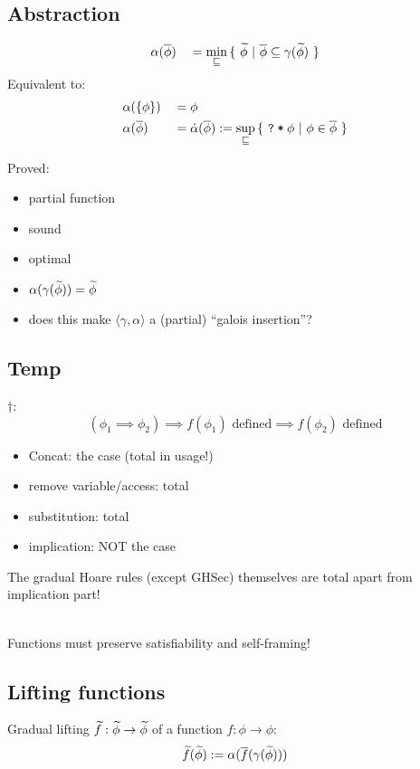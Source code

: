 \documentclass[11pt,a4paper]{article}
\begin{document}
\newcommand{\dalpha}{\dot{\alpha}}

\subsection{Abstraction}
\begin{align*}
&\alpha(\overline{\phi}) &&= \min_{\sqsubseteq} {\{~ \widetilde{\phi} ~|~ \overline{\phi} \subseteq \gamma(\widetilde{\phi}) ~\}}\\
\end{align*}
Equivalent to:
\begin{align*}
&\alpha(\{ \phi \}) &&= \phi\\
&\alpha(\overline{\phi}) &&= \dalpha(\overline{\phi}) := \sup_{\sqsubseteq} {\{~ \withqm{\phi} ~|~ \phi \in \overline{\phi} ~\}}\\
\end{align*}

Proved:
\begin{itemize}
	\item partial function
	\item sound
	\item optimal
	\item $\alpha(\gamma(\widetilde{\phi})) = \widetilde{\phi}$
    \item does this make $\langle \gamma, \alpha \rangle$ a (partial) “galois insertion”?
\end{itemize}

\subsection{Temp}
$\dagger$:
$$(\phi_1 \implies \phi_2) \implies f(\phi_1) \text{ defined} \implies f(\phi_2) \text{ defined}$$
\begin{itemize}
	\item Concat: the case (total in usage!)
	\item remove variable/access: total
	\item substitution: total
	\item implication: NOT the case
\end{itemize}
The gradual Hoare rules (except GHSec) themselves are total apart from implication part!

~\\
Functions must preserve satisfiability and self-framing!


\subsection{Lifting functions}
Gradual lifting $\widetilde{f} : \widetilde{\phi} \rightarrow \widetilde{\phi}$ of a function $f : \phi \rightarrow \phi$:
$$\widetilde{f}(\widetilde{\phi}) := \alpha(\overline{f}(\gamma(\widetilde{\phi})))$$ 
\end{document}
